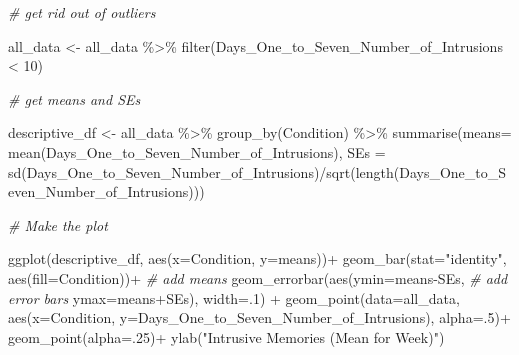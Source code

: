 \documentclass[
]{book}
\newenvironment{Shaded}{\begin{snugshade}}{\end{snugshade}}
\newcommand{\AttributeTok}[1]{\textcolor[rgb]{0.77,0.63,0.00}{#1}}
\newcommand{\CommentTok}[1]{\textcolor[rgb]{0.56,0.35,0.01}{\textit{#1}}}
\newcommand{\DecValTok}[1]{\textcolor[rgb]{0.00,0.00,0.81}{#1}}
\newcommand{\FunctionTok}[1]{\textcolor[rgb]{0.00,0.00,0.00}{#1}}
\newcommand{\NormalTok}[1]{#1}
\newcommand{\OtherTok}[1]{\textcolor[rgb]{0.56,0.35,0.01}{#1}}
\newcommand{\SpecialCharTok}[1]{\textcolor[rgb]{0.00,0.00,0.00}{#1}}
\newcommand{\StringTok}[1]{\textcolor[rgb]{0.31,0.60,0.02}{#1}}
\begin{document}
\begin{Shaded}
\begin{Highlighting}[]
\CommentTok{\# get rid out of outliers}

\NormalTok{all\_data  }\OtherTok{\textless{}{-}}\NormalTok{ all\_data }\SpecialCharTok{\%\textgreater{}\%}
             \FunctionTok{filter}\NormalTok{(Days\_One\_to\_Seven\_Number\_of\_Intrusions }\SpecialCharTok{\textless{}} \DecValTok{10}\NormalTok{)}

\CommentTok{\# get means and SEs}

\NormalTok{descriptive\_df }\OtherTok{\textless{}{-}}\NormalTok{ all\_data }\SpecialCharTok{\%\textgreater{}\%} 
                    \FunctionTok{group\_by}\NormalTok{(Condition) }\SpecialCharTok{\%\textgreater{}\%} 
                    \FunctionTok{summarise}\NormalTok{(}\AttributeTok{means=} \FunctionTok{mean}\NormalTok{(Days\_One\_to\_Seven\_Number\_of\_Intrusions),}
                              \AttributeTok{SEs =} \FunctionTok{sd}\NormalTok{(Days\_One\_to\_Seven\_Number\_of\_Intrusions)}\SpecialCharTok{/}\FunctionTok{sqrt}\NormalTok{(}\FunctionTok{length}\NormalTok{(Days\_One\_to\_Seven\_Number\_of\_Intrusions)))}

\CommentTok{\# Make the plot}

\FunctionTok{ggplot}\NormalTok{(descriptive\_df, }\FunctionTok{aes}\NormalTok{(}\AttributeTok{x=}\NormalTok{Condition, }\AttributeTok{y=}\NormalTok{means))}\SpecialCharTok{+} 
  \FunctionTok{geom\_bar}\NormalTok{(}\AttributeTok{stat=}\StringTok{"identity"}\NormalTok{, }\FunctionTok{aes}\NormalTok{(}\AttributeTok{fill=}\NormalTok{Condition))}\SpecialCharTok{+} \CommentTok{\# add means}
  \FunctionTok{geom\_errorbar}\NormalTok{(}\FunctionTok{aes}\NormalTok{(}\AttributeTok{ymin=}\NormalTok{means}\SpecialCharTok{{-}}\NormalTok{SEs,               }\CommentTok{\# add error bars}
                    \AttributeTok{ymax=}\NormalTok{means}\SpecialCharTok{+}\NormalTok{SEs), }\AttributeTok{width=}\NormalTok{.}\DecValTok{1}\NormalTok{) }\SpecialCharTok{+}
  \FunctionTok{geom\_point}\NormalTok{(}\AttributeTok{data=}\NormalTok{all\_data, }\FunctionTok{aes}\NormalTok{(}\AttributeTok{x=}\NormalTok{Condition, }\AttributeTok{y=}\NormalTok{Days\_One\_to\_Seven\_Number\_of\_Intrusions), }\AttributeTok{alpha=}\NormalTok{.}\DecValTok{5}\NormalTok{)}\SpecialCharTok{+}
  \FunctionTok{geom\_point}\NormalTok{(}\AttributeTok{alpha=}\NormalTok{.}\DecValTok{25}\NormalTok{)}\SpecialCharTok{+}
  \FunctionTok{ylab}\NormalTok{(}\StringTok{"Intrusive Memories (Mean for Week)"}\NormalTok{)}
\end{Highlighting}
\end{Shaded}
\end{document}
